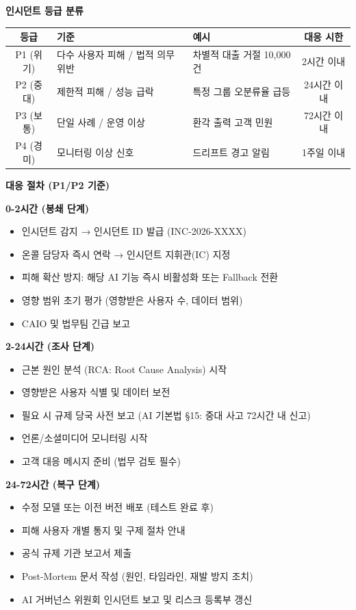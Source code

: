 \begin{tcolorbox}[colback=red!5, colframe=red!70, title={[Template C.8] AI 인시던트 대응 플레이북 (24/72h)}]
\textbf{인시던트 등급 분류}
\begin{center}
\begin{tabular}{|c|p{4cm}|p{4cm}|c|}
\hline
\textbf{등급} & \textbf{기준} & \textbf{예시} & \textbf{대응 시한} \\ \hline
P1 (위기) & 다수 사용자 피해 / 법적 의무 위반 & 차별적 대출 거절 10,000건 & 2시간 이내 \\ \hline
P2 (중대) & 제한적 피해 / 성능 급락 & 특정 그룹 오분류율 급등 & 24시간 이내 \\ \hline
P3 (보통) & 단일 사례 / 운영 이상 & 환각 출력 고객 민원 & 72시간 이내 \\ \hline
P4 (경미) & 모니터링 이상 신호 & 드리프트 경고 알림 & 1주일 이내 \\ \hline
\end{tabular}
\end{center}

\textbf{대응 절차 (P1/P2 기준)}

\textbf{0-2시간 (봉쇄 단계)}
\begin{itemize}
    \item[$\square$] 인시던트 감지 → 인시던트 ID 발급 (INC-2026-XXXX)
    \item[$\square$] 온콜 담당자 즉시 연락 → 인시던트 지휘관(IC) 지정
    \item[$\square$] 피해 확산 방지: 해당 AI 기능 즉시 비활성화 또는 Fallback 전환
    \item[$\square$] 영향 범위 초기 평가 (영향받은 사용자 수, 데이터 범위)
    \item[$\square$] CAIO 및 법무팀 긴급 보고
\end{itemize}

\textbf{2-24시간 (조사 단계)}
\begin{itemize}
    \item[$\square$] 근본 원인 분석 (RCA: Root Cause Analysis) 시작
    \item[$\square$] 영향받은 사용자 식별 및 데이터 보전
    \item[$\square$] 필요 시 규제 당국 사전 보고 (AI 기본법 §15: 중대 사고 72시간 내 신고)
    \item[$\square$] 언론/소셜미디어 모니터링 시작
    \item[$\square$] 고객 대응 메시지 준비 (법무 검토 필수)
\end{itemize}

\textbf{24-72시간 (복구 단계)}
\begin{itemize}
    \item[$\square$] 수정 모델 또는 이전 버전 배포 (테스트 완료 후)
    \item[$\square$] 피해 사용자 개별 통지 및 구제 절차 안내
    \item[$\square$] 공식 규제 기관 보고서 제출
    \item[$\square$] Post-Mortem 문서 작성 (원인, 타임라인, 재발 방지 조치)
    \item[$\square$] AI 거버넌스 위원회 인시던트 보고 및 리스크 등록부 갱신
\end{itemize}


\end{tcolorbox}
